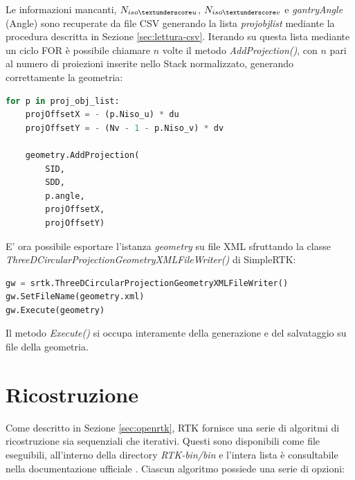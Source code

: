 \documentclass[a4paper,12pt, doubleside]{report}
\begin{document}
                Le informazioni mancanti, $N_{iso\textunderscore u}$, $N_{iso\textunderscore v}$ e \textit{gantryAngle} (Angle) sono recuperate da file CSV generando la lista \textit{proj\textunderscore obj\textunderscore list} mediante la procedura descritta in Sezione \ref{sec:lettura-csv}. Iterando su questa lista mediante un ciclo FOR è possibile chiamare $n$ volte il metodo \textit{AddProjection()}, con $n$ pari al numero di proiezioni inserite nello Stack normalizzato, generando correttamente la geometria:
                    
                \begin{lstlisting}[language=python, frame=bt]
for p in proj_obj_list: 
    projOffsetX = - (p.Niso_u) * du
    projOffsetY = - (Nv - 1 - p.Niso_v) * dv

    geometry.AddProjection(
        SID,
        SDD,
        p.angle,
        projOffsetX,
        projOffsetY)
                \end{lstlisting}
                    
                E' ora possibile esportare l'istanza \textit{geometry} su file XML sfruttando la classe \textit{ThreeDCircularProjectionGeometryXMLFileWriter()} di SimpleRTK:
                    
                \begin{lstlisting}[language=python, frame=bt]
gw = srtk.ThreeDCircularProjectionGeometryXMLFileWriter()
gw.SetFileName(geometry.xml)
gw.Execute(geometry)
                \end{lstlisting}
       
                Il metodo \textit{Execute()} si occupa interamente della generazione e del salvataggio su file della geometria.
                    
            
        \section{Ricostruzione}
        \label{sec:ricostruzione}
            \par
                Come descritto in Sezione \ref{sec:openrtk}, RTK fornisce una serie di algoritmi di ricostruzione sia sequenziali che iterativi. Questi sono disponibili come file eseguibili, all'interno della directory \textit{RTK-bin/bin} e l'intera lista è consultabile nella documentazione ufficiale \cite{rtk-recon-list}. Ciascun algoritmo possiede una serie di opzioni:
                
\end{document}
